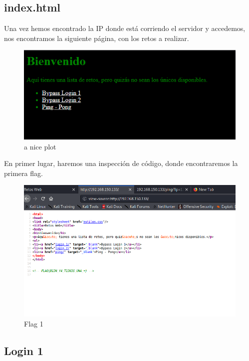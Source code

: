 \documentclass[12pt,twoside]{article}
\begin{document}
\subsection{index.html}

Una vez hemos encontrado la IP donde está corriendo el servidor y accedemos, nos encontramos la siguiente página, con los retos a realizar.

\begin{figure}[h]
    \centering
    \includegraphics[scale=0.75]{./imagenes/index}
    \caption{a nice plot}
\end{figure}

En primer lugar, haremos una inspección de código, donde encontraremos la primera flag.

\begin{figure}[h]
    \centering
    \includegraphics[scale=0.25]{./imagenes/flag_codigo_fuente}
    \caption{Flag 1}
\end{figure}



\subsection{Login 1}
\end{document}
